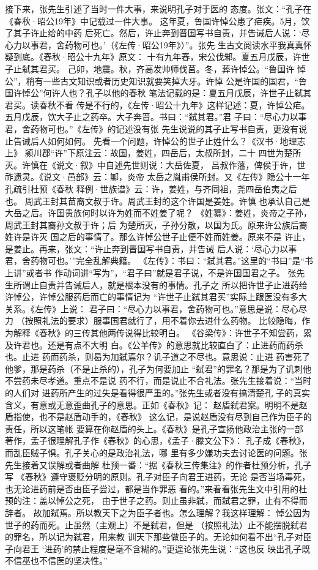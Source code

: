 接下来，张先生引述了当时一件大事，来说明孔子对于医的
态度。张文：“孔子在《春秋·昭公19年》中记载过一件大事。
这年夏，鲁国许悼公患了疟疾。5月，饮了其子许止给的中药
后死亡。然后，许止奔到晋国写书自责，并告诫后人说：‘尽
心力以事君，舍药物可也。’（《左传·昭公19年》）”。张先
生古文阅读水平我真真怀疑到底。《春秋·昭公十九年》原文：
十有九年春，宋公伐邾。夏五月戊辰，许世子止弑其君买。
己卯，地震。秋，齐高发帅师伐莒。冬，葬许悼公。“鲁国许
悼公”，稍有一些古文知识或者历史知识就要笑掉大牙。许悼
公是许国的国君，“鲁国许悼公”何许人也？孔子以他的春秋
笔法记载的是：夏五月戊辰，许世子止弑其君买。读春秋不看
传是不行的，《左传·昭公十九年》这样记述：夏，许悼公疟。
五月戊辰，饮大子止之药卒。大子奔晋。书曰：“弑其君。”君
子曰：“尽心力以事君，舍药物可也。”《左传》的记述没有张
先生说说的其子止写书自责，更没有说止告诫后人如何如何。
先看一个问题，许悼公的世子止姓什么？《汉书·地理志上》
颍川郡“许”下原注云：故国，姜姓，四岳后，太叔所封，二十
四世为楚所灭。许慎在《说文·叙》中自述先世则说：大岳佐夏，
吕叔作藩，俾侯于许，世祚遗灵。《说文·邑部》云：鄦，炎帝
太岳之胤甫侯所封。又《左传》隐公十一年孔疏引杜预《春秋
释例·世族谱》云：许，姜姓，与齐同祖，尧四岳伯夷之后也。
周武王封其苗裔文叔于许。周武王封的这个许国是姜姓。许慎
也承认自己是大岳之后。许国贵族何时以许为姓而不姓姜了呢？
《姓纂》：姜姓，炎帝之子孙，周武王封其裔孙文叔于许；后
为楚所灭，子孙分散，以国为氏。原来许公族后裔姓许是许灭
国之后的事情了。那么许悼公世子止便不姓而姓姜。原来不是
许止，是姜止。再来，张文：“许止奔到晋国写书自责，并告诫
后人说：‘尽心力以事君，舍药物可也。’”完全乱解典籍。
《左传》：书曰：“弑其君。”这里的“书曰”是“书上讲”或者书
作动词讲“写为”，“君子曰”就是君子说，不是许国国君之子。
张先生所谓止自责并告诫后人，就是根本没有的事情。孔子之
所以把许世子止进药给许悼公，许悼公服药后而亡的事情记为
“许世子止弑其君买”实际上跟医没有多大关系。《左传》上说：
君子曰：“尽心力以事君，舍药物可也。”意思是说：尽心尽力
（按照礼法的要求）服事国君就行了，用不着你去进什么药物。
比较隐晦，作为解释《春秋》的三传其他两传说得比较明白。
《谷梁传》：许世子不知尝药，累及许君也。还是有点不大明
白。《公羊传》的意思就比较直白了：止进药而药杀也。止进
药而药杀，则曷为加弑焉尔？讥子道之不尽也。意思说：止进
药害死了他爹，那是药杀（不是止杀的），孔子为何要加止
“弑君”的罪名？那是为了讥刺他不尝药未尽孝道。重点不是说
药不行，而是说止不合礼法。张先生接着说：“当时的人们对
进药所产生的过失是看得很严重的。”张先生或者没有搞清楚孔
子的真实含义，有意或无意歪曲孔子的意思。正如《春秋》记：
赵盾弑君案。明明不是赵盾指使，也不是赵盾动手的，《春秋》
这么记，是说赵盾没有尽到自己作为臣子的责任，所以这笔帐
要算在你赵盾的头上。《春秋》是孔子宣扬他政治主张的一部
著作，孟子很理解孔子作《春秋》的心思，《孟子·滕文公下》：
孔子成《春秋》，而乱臣贼子惧。孔子关心的是政治礼法，哪
里有多少嫌功夫去讨论医的问题。张先生接着又误解或者曲解
杜预一番：“据《春秋三传集注》的作者杜预分析，孔子写
《春秋》遵守褒贬分明的原则。孔子对臣子向君王进药，无论
是否当场毒死，也无论进药前是否由臣子尝过，都是当作罪恶
看的。”来看看张先生文中引用的杜预的注：盖以悼公之死，
由于世子之药。则止虽非弑，而弑君之罪，止有不得而辞者。
故加弑焉。所以教天下之为臣子者也。怎么理解？我这样理解：
悼公因为世子的药而死。止虽然（主观上）不是弑君，但是
（按照礼法）止不能摆脱弑君的罪名，所以记为弑君，用来教
训天下那些做臣子的。无论如何看不出“孔子对臣子向君王
‘进药’的禁止程度是毫不含糊的。”更遑论张先生说：“这也反
映出孔子既不信巫也不信医的坚决性。”

